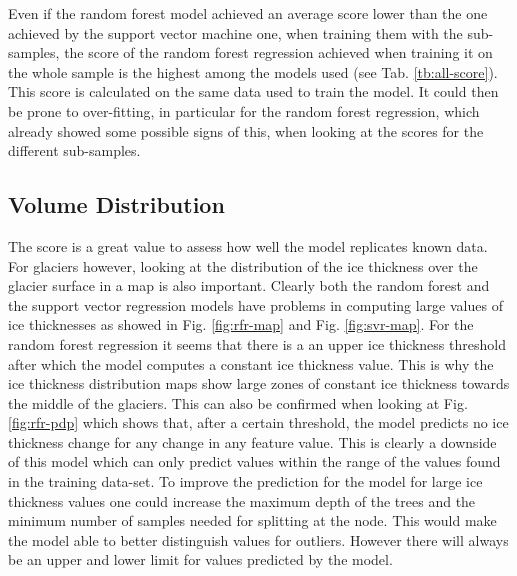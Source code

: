 Even if the random forest model achieved an average score lower than the one achieved by the support vector machine one, when training them with the sub-samples, the score of the random forest regression achieved when training it on the whole sample is the highest among the models used (see Tab. \ref{tb:all-score}). This score is calculated on the same data used to train the model. It could then be prone to over-fitting, in particular for the random forest regression, which already showed some possible signs of this, when looking at the scores for the different sub-samples.

\subsection{Volume Distribution}\label{disc-vol-dist}
The score is a great value to assess how well the model replicates known data. For glaciers however, looking at the distribution of the ice thickness over the glacier surface in a map is also important. Clearly both the random forest and the support vector regression models have problems in computing large values of ice thicknesses as showed in Fig. \ref{fig:rfr-map} and Fig. \ref{fig:svr-map}. For the random forest regression it seems that there is a an upper ice thickness threshold after which the model computes a constant ice thickness value. This is why the ice thickness distribution maps show large zones of constant ice thickness towards the middle of the glaciers. This can also be confirmed when looking at Fig. \ref{fig:rfr-pdp} which shows that, after a certain threshold, the model predicts no ice thickness change for any change in any feature value. This is clearly a downside of this model which can only predict values within the range of the values found in the training data-set. To improve the prediction for the model for large ice thickness values one could increase the maximum depth of the trees and the minimum number of samples needed for splitting at the node. This would make the model able to better distinguish values for outliers. However there will always be an upper and lower limit for values predicted by the model.

